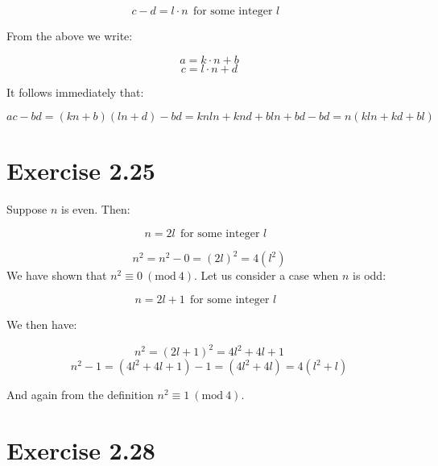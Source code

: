 \documentclass{article}
\begin{document}
\begin{equation*}
	c - d = l \cdot n \ \ \textrm{for some integer \(l\) }
\end{equation*}

From the above we write:

\begin{equation*}
	a = k \cdot n + b 
\end{equation*}
\begin{equation*}
	c = l \cdot n + d
\end{equation*}

It follows immediately that:

\begin{equation*}
	ac - bd = (kn + b)(ln + d) - bd = knln + knd + bln + bd - bd = n(kln +
	kd + bl)
\end{equation*}


\section*{Exercise 2.25}

Suppose \(n\) is even. Then:

\begin{equation*}
	n = 2l \ \ \textrm{for some integer \(l\) }
\end{equation*}

\begin{equation*}
	n^2 = n^2 - 0 = (2l)^2 = 4(l^2)
\end{equation*}
We have shown that \(n^2 \equiv 0 \ (\textrm{mod}\ 4)\). Let us consider a case
when \(n\) is odd:

\begin{equation*}
	n = 2l + 1 \ \ \textrm{for some integer \(l\) }
\end{equation*}

We then have:

\begin{equation*}
	n^2 = (2l + 1)^2 = 4l^2 + 4l + 1
\end{equation*}
\begin{equation*}
	n^2 - 1 = (4l^2 + 4l + 1) - 1 = (4l^2 + 4l) = 4(l^2 + l)
\end{equation*}

And again from the definition \(n^2 \equiv 1 \ (\textrm{mod}\ 4)\). 

\section*{Exercise 2.28}
\end{document}
